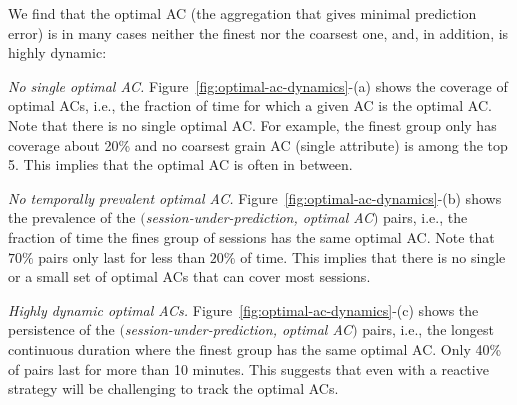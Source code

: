 We find that the optimal AC (the aggregation that gives minimal prediction error) is in many cases neither the finest nor the coarsest one, and, in addition, is highly dynamic:
 
\begin{packeditemize}
	\item {\it No single optimal AC.} Figure~\ref{fig:optimal-ac-dynamics}-(a) shows the coverage of optimal ACs, i.e., the fraction of time for which a given AC is the optimal AC. Note that there is no single optimal AC. For example, the finest group only has coverage about 20\% and no coarsest grain AC (single attribute) is among the top 5. This implies that the optimal AC is often in between.
	\item {\it No temporally prevalent optimal AC.} Figure~\ref{fig:optimal-ac-dynamics}-(b) shows the prevalence of the $($\emph{session-under-prediction, optimal AC}$)$ pairs, i.e., the fraction of time the fines group of sessions has the same optimal AC. Note that $70\%$ pairs only last for less than $20\%$ of time. This implies that there is no single or a small set of optimal ACs that can cover most sessions.
	\item {\it Highly dynamic optimal ACs.} Figure~\ref{fig:optimal-ac-dynamics}-(c) shows the persistence of the $($\emph{session-under-prediction, optimal AC}$)$ pairs, i.e., the longest continuous duration where the finest group has the same optimal AC. Only 40\% of pairs last for more than 10 minutes. This suggests that even with a reactive strategy will be challenging to track the optimal ACs.
\end{packeditemize}



